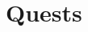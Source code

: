 \documentclass[a4paper]{article}
\begin{document}

\newpage
\section{Quests} \label{quests}
\end{document}
